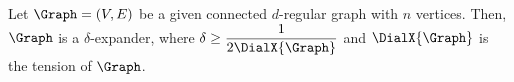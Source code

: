\begin{lemma}
    Let $\Graph=(V,E)$ be a given connected $d$-regular graph with $n$
    vertices. Then, $\Graph$ is a $\delta$-expander, where
    $\displaystyle \delta \geq \frac{1}{2 \DialX{\Graph}}$ and 
    $\DialX{\Graph}$ is the tension of $\Graph$.

\end{lemma}
